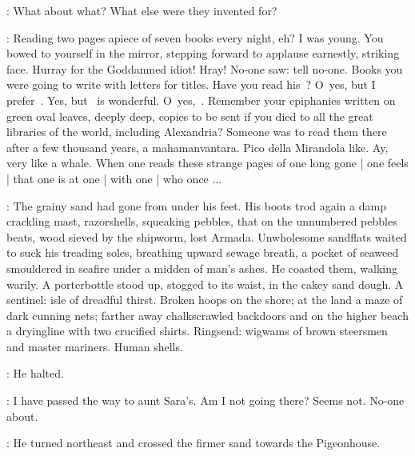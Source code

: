 \StephenInt:
What about what?
What else were they invented for?

\StephenInt:
Reading two pages apiece of seven books every night, eh?
I was young.
You bowed to yourself in the mirror,
stepping forward to applause earnestly, striking face.
Hurray for the Goddamned idiot!
Hray!
No-one saw:
tell no-one.
Books you were going to write with letters for titles.
Have you read his~?
O~yes, but I prefer~.
Yes, but ~is wonderful.
O~yes,~.
Remember your epiphanies written on green oval leaves,
deeply deep,
copies to be sent if you died to all the great libraries of the world,
including Alexandria?
Someone was to read them there after a few thousand years,
a mahamanvantara.
Pico della Mirandola like.
Ay, very like a whale.
When one reads these strange pages of one long gone |
one feels |
that one is at one |
with one |
who once ...

:
The grainy sand had gone from under his feet.
His boots trod again a damp crackling mast,
razorshells, squeaking pebbles,
that on the unnumbered pebbles beats,
wood sieved by the shipworm,
lost Armada.
Unwholesome sandflats waited to suck his treading soles,
breathing upward sewage breath,
a pocket of seaweed smouldered in seafire under a midden of man's ashes.
He coasted them, walking warily.
A porterbottle stood up,
stogged to its waist, in the cakey sand dough.
A sentinel:
isle of dreadful thirst.
Broken hoops on the shore;
at the land a maze of dark cunning nets;
farther away chalkscrawled backdoors
and on the higher beach
a dryingline with two crucified shirts.
Ringsend:
wigwams of brown steersmen and master mariners.
Human shells.

:
He halted.

\StephenInt:
I have passed the way to aunt Sara's.
Am I not going there?
Seems not.
No-one about.

:
He turned northeast and crossed the firmer sand
towards the Pigeonhouse.
